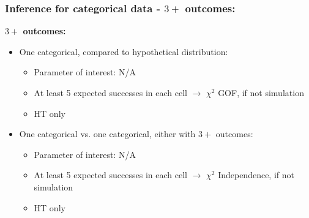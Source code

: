 \documentclass[slidestop,compress,mathserif,12pt,t,professionalfonts,xcolor=table]{beamer}
\begin{document}
\begin{frame}
\frametitle{Inference for categorical data - $3+$ outcomes:}

\textbf{$3+$ outcomes:}

\pause

\begin{itemize}

\item One categorical, compared to hypothetical distribution: \\
\begin{itemize}
\item Parameter of interest: N/A
\item At least 5 expected  successes in each cell $\rightarrow$ $\chi^2$ GOF, if not simulation
\item HT only
\end{itemize}

\pause

\item One categorical vs. one categorical, either with $3+$ outcomes: \\
\begin{itemize}
\item Parameter of interest: N/A
\item At least 5 expected successes in each cell $\rightarrow$ $\chi^2$ Independence, if not simulation
\item HT only
\end{itemize}

\end{itemize}

\end{frame}

\end{document}
